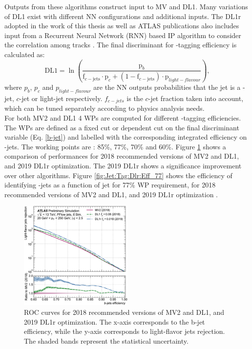 Outputs from these algorithms construct input to MV and DL1. Many variations of DL1 exist with different NN configurations and additional inputs. The DL1r adopted in the work of this thesis as well as ATLAS publications also includes input from a Recurrent Neural Network (RNN) based IP algorithm to consider the correlation among tracks \cite{DL1r}. The final discriminant for \bq-tagging efficiency is calculated as:
\begin{equation}
    \mathrm{DL} 1=\ln \left(\frac{\mathrm{p}_{b}}{\mathrm{f}_{c-\mathrm{jets}} \cdot \mathrm{p}_{c}+\left(1-\mathrm{f}_{c-\mathrm{jets}}\right) \cdot \mathrm{p}_{light-flavour }}\right),
    \label{b-jet}
\end{equation}
where $p_b$, $p_c$ and $p_{light-flavour}$ are the NN outputs probabilities that the jet is a \bq-jet, $c$-jet or light-jet respectively. $f_{c-jets}$ is the $c$-jet fraction taken into account, which can be tuned separately according to physics analysis needs. \\  
For both MV2 and DL1 4 WPs are computed for different \bq-tagging efficiencies. The WPs are defined as a fixed cut or \pT dependent cut on the final discriminant variable (Eq. \ref{b-jet}) and labelled with the corresponding integrated efficiency on \bq-jets. The working points are : 85\%, 77\%, 70\% and 60\%. Figure \ref{fig:Jet:Tag:Dlr:Eff} shows a comparison of performances for 2018 recommended versions of MV2 and DL1, and 2019 DL1r optimization. The 2019 DL1r shows a significance improvement over other algorithms. Figure \ref{fig:Jet:Tag:Dlr:Eff_77} shows the efficiency of identifying \bq-jets as a function of jet \pT for 77\% WP requirement, for 2018 recommended versions of MV2 and DL1, and 2019 DL1r optimization \cite{Btag_Perf}. 
\begin{figure}[ht]
    \centering
    \includegraphics[width=0.5\textwidth]{Ch4/Img/b_jet_Eff.png}
    \caption{ROC curves for 2018 recommended versions of MV2 and DL1, and 2019 DL1r optimization. The x-axis corresponds to the b-jet efficiency, while the y-axis corresponds to light-flavor jets rejection. The shaded bands represent the statistical uncertainty.}
    \label{fig:Jet:Tag:Dlr:Eff}
\end{figure}
